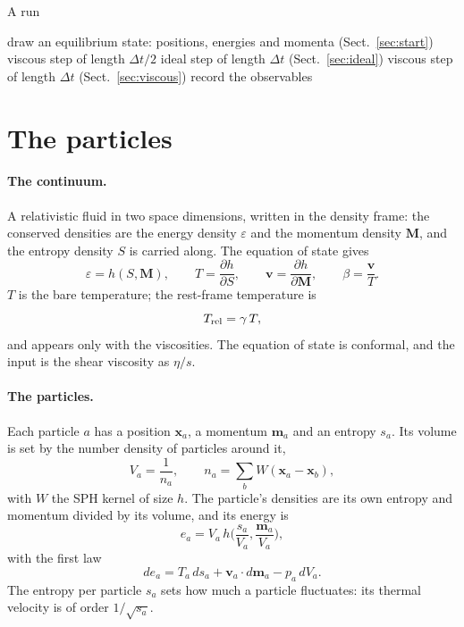 \documentclass[11pt,aps,preprint,nofootinbib,superscriptaddress,tightenlines]{revtex4-2}
\def\st{\begin{equation}}
\def\stp{\end{equation}}
\def\Sect#1{Sect.~\ref{#1}}
\let\oldparagraph\paragraph
\renewcommand{\paragraph}{\par\bigskip\oldparagraph}
\begin{document}
\begin{algobox}{A run}
\begin{algorithmic}[1]
\State draw an equilibrium state: positions, energies and momenta (\Sect{sec:start})
\State viscous step of length $\Delta t/2$
  \State ideal step of length $\Delta t$ (\Sect{sec:ideal})
  \State viscous step of length $\Delta t$ (\Sect{sec:viscous}) 
  \State record the observables
\EndFor
\end{algorithmic}
\end{algobox}

\section{The particles}
\label{sec:particles}

\paragraph{The continuum.}  A relativistic fluid in two space dimensions, written in the density frame: the conserved densities are the energy
density $\varepsilon$ and the momentum density $\bm M$, and the entropy density $S$ is carried along.  The equation of state gives
\st
\varepsilon=h(S,\bm M),\qquad T=\frac{\partial h}{\partial S},\qquad \bm v=\frac{\partial h}{\partial\bm M},\qquad \beta=\frac{\bm v}T .
\stp
$T$ is the bare temperature; the rest-frame temperature is
\st
T_{\rm rel}=\gamma\,T ,
\stp
and appears only with the viscosities.  The equation of state is conformal, and the input is the shear viscosity as $\eta/s$.

\paragraph{The particles.}  Each particle $a$ has a position $\bm x_a$, a momentum $\bm m_a$ and an entropy $s_a$.  Its volume is set by the number
density of particles around it,
\st
V_a=\frac1{n_a},\qquad n_a=\sum_bW(\bm x_a-\bm x_b),
\stp
with $W$ the SPH kernel of size $h$.  The particle's densities are its own entropy and momentum divided by its volume, and its energy is
\st
e_a=V_a\,h\Big(\frac{s_a}{V_a},\frac{\bm m_a}{V_a}\Big),
\stp
with the first law
\st
de_a=T_a\,ds_a+\bm v_a\cdot d\bm m_a-p_a\,dV_a .
\label{firstlaw}
\stp
The entropy per particle $s_a$ sets how much a particle fluctuates: its thermal velocity is of order $1/\sqrt{s_a}$.
\end{document}
